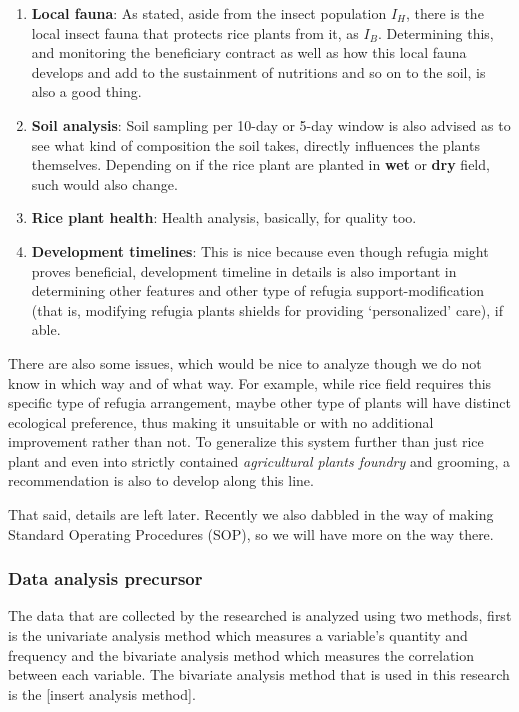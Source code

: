 \documentclass[twocolumn,letterpaper, 12pt]{article}
\begin{document}
\begin{enumerate}
    \item \textbf{Local fauna}: As stated, aside from the insect population $I_H$, there is the local insect fauna that protects rice plants from it, as $I_B$. Determining this, and monitoring the beneficiary contract as well as how this local fauna develops and add to the sustainment of nutritions and so on to the soil, is also a good thing. 
    \item \textbf{Soil analysis}: Soil sampling per 10-day or 5-day window is also advised as to see what kind of composition the soil takes, directly influences the plants themselves. Depending on if the rice plant are planted in \textbf{wet} or \textbf{dry} field, such would also change. 
    \item \textbf{Rice plant health}: Health analysis, basically, for quality too. 
    \item \textbf{Development timelines}: This is nice because even though refugia might proves beneficial, development timeline in details is also important in determining other features and other type of refugia support-modification (that is, modifying refugia plants shields for providing `personalized' care), if able. 
\end{enumerate}

There are also some issues, which would be nice to analyze though we do not know in which way and of what way. For example, while rice field requires this specific type of refugia arrangement, maybe other type of plants will have distinct ecological preference, thus making it unsuitable or with no additional improvement rather than not. To generalize this system further than just rice plant and even into strictly contained \textit{agricultural plants foundry} and grooming, a recommendation is also to develop along this line. 

That said, details are left later. Recently we also dabbled in the way of making Standard Operating Procedures (SOP), so we will have more on the way there. 

\subsubsection{Data analysis precursor}

The data that are collected by the researched is analyzed using two methods, first is the univariate analysis method which measures a variable’s quantity and frequency and the bivariate analysis method which measures the correlation between each variable. The bivariate analysis method that is used in this research is the [insert analysis method].
\end{document}
